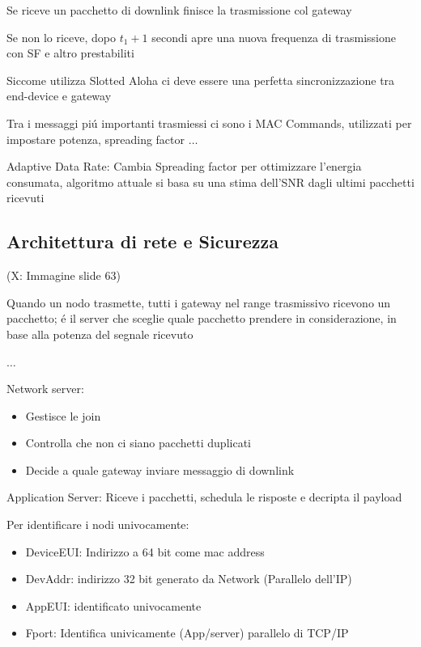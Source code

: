 \documentclass{article}
\begin{document}
Se riceve un pacchetto di downlink finisce la trasmissione col gateway

Se non lo riceve, dopo $t_1 + 1$ secondi apre una nuova frequenza di trasmissione con SF e altro prestabiliti

Siccome utilizza Slotted Aloha ci deve essere una perfetta sincronizzazione tra end-device e gateway

Tra i messaggi pi\'u importanti trasmiessi ci sono i MAC Commands, utilizzati per impostare potenza, spreading factor $\ldots$


Adaptive Data Rate: Cambia Spreading factor per ottimizzare l'energia consumata, algoritmo attuale si basa su una stima dell'SNR dagli ultimi pacchetti ricevuti

\subsection{Architettura di rete e Sicurezza}
\begin{center}
(X: Immagine slide 63)
\end{center}

Quando un nodo trasmette, tutti i gateway nel range trasmissivo ricevono un pacchetto; \'e il server che sceglie quale pacchetto prendere in considerazione, in base alla potenza del segnale ricevuto

$\ldots$

Network server:
\begin{itemize}
    \item Gestisce le join
    \item Controlla che non ci siano pacchetti duplicati
    \item Decide a quale gateway inviare messaggio di downlink
\end{itemize}

Application Server: Riceve i pacchetti, schedula le risposte e decripta il payload

Per identificare i nodi univocamente:
\begin{itemize}
    \item DeviceEUI: Indirizzo a 64 bit come mac address
    \item DevAddr: indirizzo 32 bit generato da Network (Parallelo dell'IP)
    \item AppEUI: identificato univocamente
    \item Fport: Identifica univicamente (App/server) parallelo di TCP/IP
\end{itemize}
\end{document}
